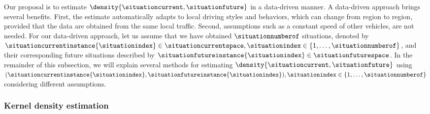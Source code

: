 Our proposal is to estimate $\density{\situationcurrent, \situationfuture}$ in a data-driven manner. 
A data-driven approach brings several benefits.
First, the estimate automatically adapts to local driving styles and behaviors, which can change from region to region, provided that the data are obtained from the same local traffic.
Second, assumptions such as a constant speed of other vehicles, are not needed.
For our data-driven approach, let us assume that we have obtained $\situationnumberof$ situations, denoted by $\situationcurrentinstance{\situationindex}\in\situationcurrentspace, \situationindex\in\{1,\ldots,\situationnumberof\}$, and their corresponding future situations described by $\situationfutureinstance{\situationindex}\in\situationfuturespace$.
\cstartb In the remainder of this subsection, we will explain several methods for estimating $\density{\situationcurrent, \situationfuture}$ using $(\situationcurrentinstance{\situationindex},\situationfutureinstance{\situationindex}), \situationindex\in\{1,\ldots,\situationnumberof\}$ considering different assumptions. \cendb



\cstartb\subsubsection{Kernel density estimation}\cendb
\label{sec:one kde}


